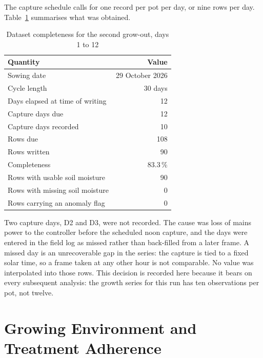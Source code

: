 The capture schedule calls for one record per pot per day, or nine rows per
day. Table~\ref{tab:completeness} summarises what was obtained.

\begin{table}[ht]
\centering
\caption{Dataset completeness for the second grow-out, days 1 to 12}
\label{tab:completeness}
\begin{tabular}{lr}
\toprule
\textbf{Quantity} & \textbf{Value} \\
\midrule
Sowing date                       & 29 October 2026 \\
Cycle length                      & 30 days \\
Days elapsed at time of writing   & 12 \\
Capture days due                  & 12 \\
Capture days recorded             & 10 \\
Rows due                          & 108 \\
Rows written                      & 90 \\
Completeness                      & 83.3\,\% \\
Rows with usable soil moisture    & 90 \\
Rows with missing soil moisture   & 0 \\
Rows carrying an anomaly flag     & 0 \\
\bottomrule
\end{tabular}
\end{table}

Two capture days, D2 and D3, were not recorded. The cause was loss of mains
power to the controller before the scheduled noon capture, and the days were
entered in the field log as missed rather than back-filled from a later frame.
A missed day is an unrecoverable gap in the series: the capture is tied to a
fixed solar time, so a frame taken at any other hour is not comparable. No
value was interpolated into those rows. This decision is recorded here because
it bears on every subsequent analysis: the growth series for this run has ten
observations per pot, not twelve.

\section{Growing Environment and Treatment Adherence}

